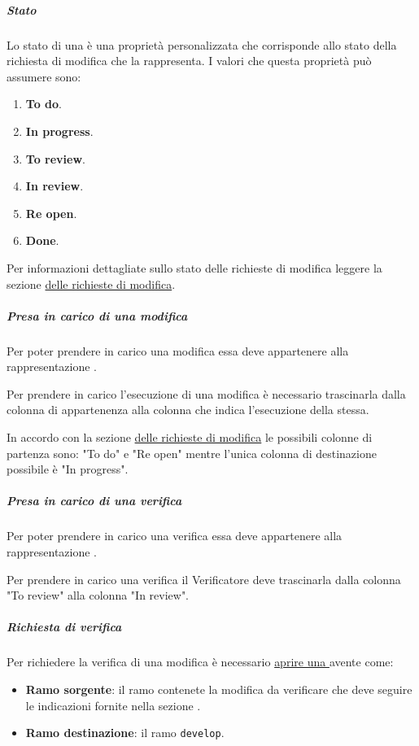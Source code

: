 \subparagraph{Stato}
\label{subpar:github_stato}
Lo stato di una  è una proprietà personalizzata che corrisponde allo stato della richiesta di modifica che la  rappresenta.
I valori che questa proprietà può assumere sono:
\begin{enumerate}
    \item \textbf{To do}.
    \item \textbf{In progress}.
    \item \textbf{To review}.
    \item \textbf{In review}.
    \item \textbf{Re open}.
    \item \textbf{Done}.
\end{enumerate}
Per informazioni dettagliate sullo stato delle richieste di modifica leggere la sezione \hyperref[par:ciclo_vita_richieste_di_modifica]{ delle richieste di modifica}.

\subparagraph{Presa in carico di una modifica}
\label{subpar:presa_carico_modifica}
Per poter prendere in carico una modifica essa deve appartenere alla rappresentazione \hyperref[item:sprint_backlog]{}.

Per prendere in carico l'esecuzione di una modifica è necessario trascinarla dalla colonna di appartenenza alla colonna che indica l'esecuzione della stessa.

In accordo con la sezione \hyperref[par:ciclo_vita_richieste_di_modifica]{ delle richieste di modifica} le possibili colonne di partenza sono: "To do" e "Re open" mentre l'unica colonna di destinazione possibile è "In progress".

\subparagraph{Presa in carico di una verifica}
\label{subpar:presa_carico_verifica}
Per poter prendere in carico una verifica essa deve appartenere alla rappresentazione \hyperref[item:sprint_backlog]{}.

Per prendere in carico una verifica il Verificatore deve trascinarla dalla colonna "To review" alla colonna "In review".

\subparagraph{Richiesta di verifica}
\label{subpar:github_richiesta_di_verifica}
Per richiedere la verifica di una modifica è necessario \hyperref[item:creazione_pull_request]{aprire una } avente come:
\begin{itemize}
    \item \textbf{Ramo sorgente}: il ramo contenete la modifica da verificare che deve seguire le indicazioni fornite nella sezione \hyperref[subpar:strategia_di_branching_documenti]{}.
    
    \item \textbf{Ramo destinazione}: il ramo \texttt{develop}.
\end{itemize}

